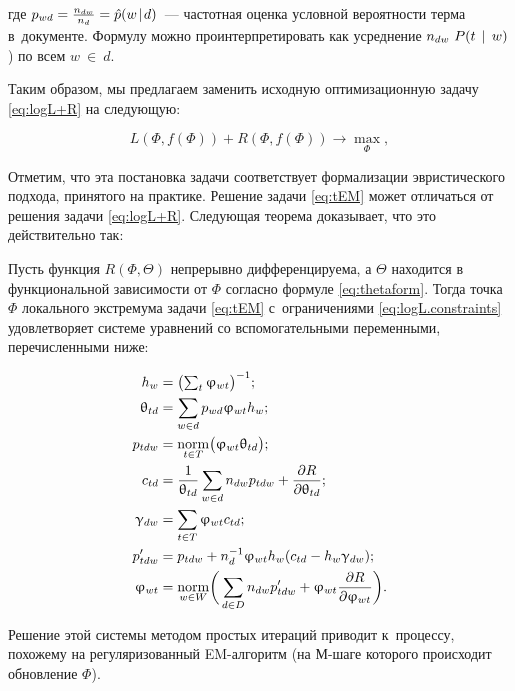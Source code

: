 где $p_{wd} = \frac{n_{dw}}{n_d} = \hat p(w\mspace{2mu}{|}\mspace{2mu} d)$~--- частотная оценка условной вероятности терма в~документе. Формулу можно проинтерпретировать как усреднение $n_{dw}~P(t~\mspace{2mu}{|}\mspace{2mu}~w)$) по всем $w~\in~d$.

Таким образом, мы предлагаем заменить исходную оптимизационную задачу \eqref{eq:logL+R} на следующую:

\begin{equation} \label{eq:tEM}
L(\Phi, f(\Phi) ) + R(\Phi, f(\Phi) ) \to \max_{\Phi},
\end{equation}

Отметим, что эта постановка задачи соответствует формализации эвристического подхода, принятого на практике. Решение задачи \eqref{eq:tEM} может отличаться от решения задачи \eqref{eq:logL+R}. Следующая теорема доказывает, что это действительно так:

\begin{Theorem}
\label{th:TARTM}
    Пусть функция $R(\Phi,\Theta)$ непрерывно дифференцируема, а $\Theta$ находится в функциональной зависимости от $\Phi$ согласно формуле \eqref{eq:thetaform}.
    Тогда точка $\Phi$ локального экстремума задачи
    \eqref{eq:tEM} с~ограничениями \eqref{eq:logL.constraints}
    удовлетворяет системе уравнений со вспомогательными переменными, перечисленными ниже:

\begin{align*}
    h_w         &= \bigl( \textstyle\sum_t \upvarphi_{wt} \bigr)^{-1}; \\
    \uptheta_{td} &= \sum_{w\in d} p_{wd} \upvarphi_{wt} h_w; \\
    p_{tdw}     &= \mathop{\mathrm{norm}}\limits_{t\in T} \bigl(\upvarphi_{wt}\uptheta_{td} \bigr); \\
    c_{td}      &= \frac1{\uptheta_{td}}\sum_{w\in d} n_{dw}p_{tdw} + \frac{\partial R}{\partial \uptheta_{td}}; \\
    \upgamma_{dw} &= \sum_{t\in T} \upvarphi_{wt} c_{td}; \\
    p'_{tdw}    &= p_{tdw} + n_d^{-1} \upvarphi_{wt}h_w (c_{td}-h_w\upgamma_{dw});
\\
    \upvarphi_{wt} &= \mathop{\mathrm{norm}}\limits_{w\in W}
        \biggl(\,
        \sum_{d\in D} n_{dw} p'_{tdw}
        + \upvarphi_{wt} \frac{\partial{R}}{\partial{\ensuremath{\upvarphi}_{wt}}}
        \biggr).
\end{align*}
\end{Theorem}

Решение этой системы методом простых итераций приводит к~процессу, похожему на регуляризованный EM-алгоритм (на М-шаге которого происходит обновление $\Phi$).

